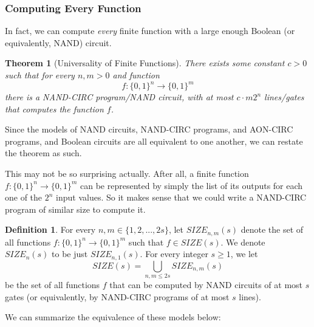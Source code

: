 \documentclass[a4paper, 12pt]{report}
\newtheorem{theorem}{Theorem}[section]
\theoremstyle{remark}
\theoremstyle{definition}
\newtheorem{definition}{Definition}[section]
\begin{document}
\subsubsection{Computing Every Function}

In fact, we can compute \textit{every} finite function with a large enough Boolean (or equivalently, NAND) circuit. 

\begin{theorem}[Universality of Finite Functions]
There exists some constant $c > 0$ such that for every $n, m > 0$ and function
\[f: \{0,1\}^n \longrightarrow \{0,1\}^m\]
there is a NAND-CIRC program/NAND circuit,  with at most $c \cdot m 2^n$ lines/gates that computes the function $f$. 
\end{theorem}

Since the models of NAND circuits, NAND-CIRC programs, and AON-CIRC programs, and Boolean circuits are all equivalent to one another, we can restate the theorem as such. 

This may not be so surprising actually. After all, a finite function $f: \{0,1\}^n \longrightarrow \{0,1\}^m$ can be represented by simply the list of its outputs for each one of the $2^n$ input values. So it makes sense that we could write a NAND-CIRC program of similar size to compute it. 

\begin{definition}
For every $n, m \in \{1, 2, ..., 2s\}$, let $SIZE_{n, m} (s)$ denote the set of all functions $f: \{0,1\}^n \longrightarrow \{0,1\}^m$ such that $f \in SIZE(s)$. We denote $SIZE_n (s)$ to be just $SIZE_{n,1} (s)$. For every integer $s \geq 1$, we let 
\[SIZE(s) = \bigcup_{n, m \leq 2s} SIZE_{n, m} (s)\]
be the set of all functions $f$ that can be computed by NAND circuits of at most $s$ gates (or equivalently, by NAND-CIRC programs of at most $s$ lines). 
\end{definition}

We can summarize the equivalence of these models below: 
\begin{center}
\end{center}
\end{document}

